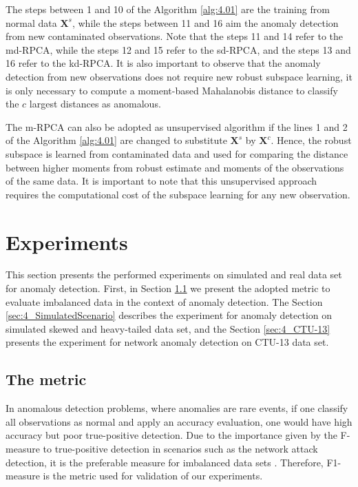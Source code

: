 The steps between 1 and 10 of the Algorithm \ref{alg:4.01} are the training from normal data $\boldsymbol{X}^s$, while the steps between 11 and 16 aim the anomaly detection from new contaminated observations. Note that the steps 11 and 14 refer to the md-RPCA, while the steps 12 and 15 refer to the sd-RPCA, and the steps 13 and 16 refer to the kd-RPCA. It is also important to observe that the anomaly detection from new observations does not require new robust subspace learning, it is only necessary to compute a moment-based Mahalanobis distance to classify the $c$ largest distances as anomalous.

The m-RPCA can also be adopted as unsupervised algorithm if the lines 1 and 2 of the Algorithm \ref{alg:4.01} are changed to substitute $\boldsymbol{X}^s$ by $\boldsymbol{X}^c$. Hence, the robust subspace is learned from contaminated data and used for comparing the distance between higher moments from robust estimate and moments of the observations of the same data. It is important to note that this unsupervised approach requires the computational cost of the subspace learning for any new observation.

\section{Experiments}
\label{sec:4_experiments}

This section presents the performed experiments on simulated and real data set for anomaly detection. First, in Section \ref{sec:4_metric} we present the adopted metric to evaluate imbalanced data in the context of anomaly detection. The Section \ref{sec:4_SimulatedScenario} describes the experiment for anomaly detection on simulated skewed and heavy-tailed data set, and the Section \ref{sec:4_CTU-13} presents the experiment for network anomaly detection on CTU-13 data set.

\subsection{The metric}
\label{sec:4_metric}

In anomalous detection problems, where anomalies are rare events, if one classify all observations as normal and apply an accuracy evaluation, one would have high accuracy but poor true-positive detection. Due to the importance given by the F-measure to true-positive detection in scenarios such as the network attack detection, it is the preferable measure for imbalanced data sets \cite{powers2011evaluation,moustafa2019holistic}. Therefore, F1-measure is the metric used for validation of our experiments.

